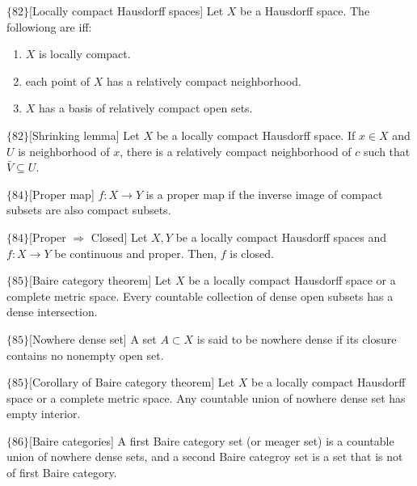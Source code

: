 \documentclass{article}
\begin{document}
\begin{flexilemma}{$\{82\}$}[Locally compact Hausdorff spaces]
    Let $X$ be a Hausdorff space. The followiong are iff:
    \begin{enumerate}[label = (\alph*)]
        \item $X$ is locally compact.
        \item each point of $X$ has a relatively compact neighborhood.
        \item $X$ has a basis of relatively compact open sets.
    \end{enumerate}
\end{flexilemma}

\begin{flexilemma}{$\{82\}$}[Shrinking lemma]
    Let $X$ be a locally compact Hausdorff space. If $x \in X$ and $U$ is neighborhood of $x$, there is a relatively compact neighborhood of $c$ such that $\bar V \subseteq U$.
\end{flexilemma}

\begin{flexidefinition}{$\{84\}$}[Proper map]
    $f:X \to Y$ is a proper map if the inverse image of compact subsets are also compact subsets.
\end{flexidefinition}

\begin{flexilemma}{$\{84\}$}[Proper $\Rightarrow$ Closed]
    Let $X,Y$ be a locally compact Hausdorff spaces and $f : X \to Y$ be continuous and proper. Then, $f$ is closed.
\end{flexilemma}

\begin{flexitheorem}{$\{85\}$}[Baire category theorem]
    Let $X$ be a locally compact Hausdorff space or a complete metric space. Every countable collection of dense open subsets has a dense intersection.
\end{flexitheorem}

\begin{flexidefinition}{$\{85\}$}[Nowhere dense set]
    A set $A \subset X$ is said to be nowhere dense if its closure contains no nonempty open set.
\end{flexidefinition}

\begin{flexilemma}{$\{85\}$}[Corollary of Baire category theorem]
    Let $X$ be a locally compact Hausdorff space or a complete metric space. Any countable union of nowhere dense set has empty interior.
\end{flexilemma}

\begin{flexidefinition}{$\{86\}$}[Baire categories]
    A first Baire category set (or meager set) is a countable union of nowhere dense sets, and a second Baire categroy set is a set that is not of first Baire category.
\end{flexidefinition}







{}

\end{document}
